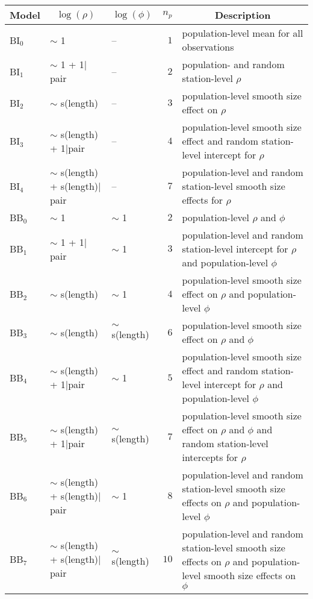 \begin{center}
\begin{tabular}{lllrp{}}
\hline\hline
\multicolumn{1}{c}{Model}&\multicolumn{1}{c}{$\log\left(\rho\right)$}&\multicolumn{1}{c}{$\log\left(\phi\right)$}&\multicolumn{1}{c}{$n_p$}&\multicolumn{1}{c}{Description}\tabularnewline
\hline
BI$_{0}$&$\sim$ 1&--&$ 1$&population-level mean for all observations\tabularnewline
BI$_{1}$&$\sim$ 1 + 1$|$pair&--&$ 2$&population- and random station-level $\rho$\tabularnewline
BI$_{2}$&$\sim$ s(length)&--&$ 3$&population-level smooth size effect on $\rho$\tabularnewline
BI$_{3}$&$\sim$ s(length) + 1$|$pair&--&$ 4$&population-level smooth size effect and random station-level intercept for $\rho$\tabularnewline
BI$_{4}$&$\sim$ s(length) + s(length)$|$pair&--&$ 7$&population-level and random station-level smooth size effects for $\rho$\tabularnewline
BB$_{0}$&$\sim$ 1&$\sim$ 1&$ 2$&population-level $\rho$ and $\phi$\tabularnewline
BB$_{1}$&$\sim$ 1 + 1$|$pair&$\sim$ 1&$ 3$&population-level and random station-level intercept for $\rho$ and population-level $\phi$\tabularnewline
BB$_{2}$&$\sim$ s(length)&$\sim$ 1&$ 4$&population-level smooth size effect on $\rho$ and population-level $\phi$\tabularnewline
BB$_{3}$&$\sim$ s(length)&$\sim$ s(length)&$ 6$&population-level smooth size effect on $\rho$ and $\phi$\tabularnewline
BB$_{4}$&$\sim$ s(length) + 1$|$pair&$\sim$ 1&$ 5$&population-level smooth size effect and random station-level intercept for $\rho$ and population-level $\phi$\tabularnewline
BB$_{5}$&$\sim$ s(length) + 1$|$pair&$\sim$ s(length)&$ 7$&population-level smooth size effect on $\rho$ and $\phi$ and random station-level intercepts for $\rho$\tabularnewline
BB$_{6}$&$\sim$ s(length) + s(length)$|$pair&$\sim$ 1&$ 8$&population-level and random station-level smooth size effects on $\rho$ and population-level $\phi$\tabularnewline
BB$_{7}$&$\sim$ s(length) + s(length)$|$pair&$\sim$ s(length)&$10$&population-level and random station-level smooth size effects on $\rho$ and population-level smooth size effects on $\phi$\tabularnewline
\hline
\end{tabular}\end{center}

